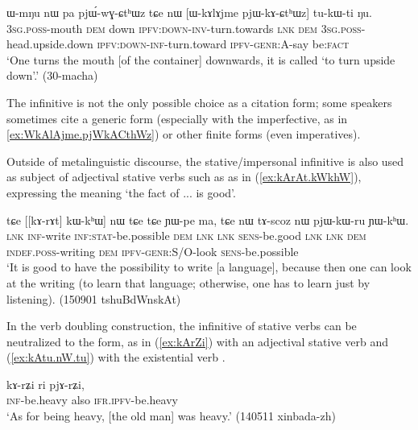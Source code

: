 \begin{exe}
\ex \label{ex:WkAlAjme.pjWkACthWz}
 \gll  ɯ-mŋu nɯ pa pjɯ́-wɣ-ɕtʰɯz tɕe nɯ [ɯ-kɤlɤjme pjɯ-kɤ-ɕtʰɯz] tu-kɯ-ti ŋu. \\
\textsc{3sg}.\textsc{poss}-mouth \textsc{dem} down \textsc{ipfv}:\textsc{down}-\textsc{inv}-turn.towards \textsc{lnk} \textsc{dem}  \textsc{3sg}.\textsc{poss}-head.upside.down   \textsc{ipfv}:\textsc{down}-\textsc{inf}-turn.toward \textsc{ipfv}-\textsc{genr}:A-say be:\textsc{fact}  \\
\glt `One turns the mouth [of the container] downwards, it is called `to turn upside down'.' (30-macha)
\end{exe}

The infinitive is not the only possible choice as a citation form; some speakers sometimes cite a generic form (especially with the imperfective, as  in \ref{ex:WkAlAjme.pjWkACthWz}) or other finite forms (even imperatives).

Outside of metalinguistic discourse, the stative/impersonal infinitive is also used as subject of adjectival stative verbs such as  as in (\ref{ex:kArAt.kWkhW}), expressing the meaning `the fact of ... is good'.

\begin{exe}
\ex \label{ex:kArAt.kWkhW}
 \gll tɕe [[kɤ-rɤt] kɯ-kʰɯ] nɯ tɕe tɕe ɲɯ-pe ma, tɕe nɯ tɤ-scoz nɯ pjɯ-kɯ-ru ɲɯ-kʰɯ. \\
 \textsc{lnk} \textsc{inf}-write \textsc{inf}:\textsc{stat}-be.possible \textsc{dem} \textsc{lnk} \textsc{lnk} \textsc{sens}-be.good \textsc{lnk} \textsc{lnk} \textsc{dem} \textsc{indef}.\textsc{poss}-writing \textsc{dem} \textsc{ipfv}-\textsc{genr}:S/O-look \textsc{sens}-be.possible \\
 \glt `It is good to have the possibility to write [a language], because then one can look at the writing (to learn that language; otherwise, one has to learn just by listening). (150901 tshuBdWnskAt)
\end{exe}

In the verb doubling construction, the infinitive of stative verbs can be neutralized to the  form, as in (\ref{ex:kArZi}) with an adjectival stative verb and (\ref{ex:kAtu.nW.tu}) with the existential verb .

\begin{exe}
\ex \label{ex:kArZi}
 \gll kɤ-rʑi ri pjɤ-rʑi, 	  \\
 \textsc{inf}-be.heavy also \textsc{ifr}.\textsc{ipfv}-be.heavy \\
 \glt `As for being heavy, [the old man] was heavy.'  (140511 xinbada-zh) 
\end{exe}

